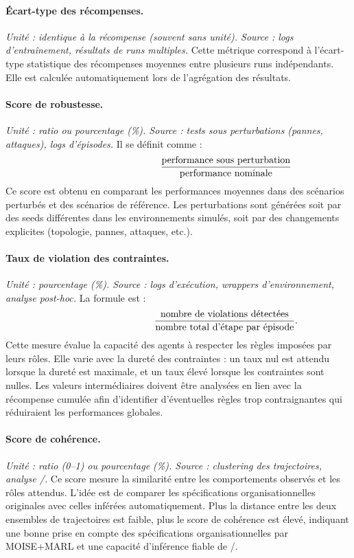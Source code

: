 \paragraph{Écart-type des récompenses.}
\textit{Unité : identique à la récompense (souvent sans unité). Source : logs d'entraînement, résultats de runs multiples.}
Cette métrique correspond à l'écart-type statistique des récompenses moyennes entre plusieurs runs indépendants.
Elle est calculée automatiquement lors de l'agrégation des résultats.

\paragraph{Score de robustesse.}
\textit{Unité : ratio ou pourcentage (\%). Source : tests sous perturbations (pannes, attaques), logs d'épisodes.}
Il se définit comme :
\[
  \hspace{3.5cm}\frac{\text{performance sous perturbation}}{\text{performance nominale}}
\]
Ce score est obtenu en comparant les performances moyennes dans des scénarios perturbés et des scénarios de référence.
Les perturbations sont générées soit par des seeds différentes dans les environnements simulés, soit par des changements explicites (topologie, pannes, attaques, etc.).

\paragraph{Taux de violation des contraintes.}
\textit{Unité : pourcentage (\%). Source : logs d'exécution, wrappers d'environnement, analyse post-hoc.}
La formule est :
\[
  \hspace{3.5cm}\frac{\text{nombre de violations détectées}}{\text{nombre total d'étape par épisode}}.
\]
Cette mesure évalue la capacité des agents à respecter les règles imposées par leurs rôles.
Elle varie avec la dureté des contraintes : un taux nul est attendu lorsque la dureté est maximale, et un taux élevé lorsque les contraintes sont nulles.
Les valeurs intermédiaires doivent être analysées en lien avec la récompense cumulée afin d'identifier d'éventuelles règles trop contraignantes qui réduiraient les performances globales.

\paragraph{Score de cohérence.}
\textit{Unité : ratio (0–1) ou pourcentage (\%). Source : clustering des trajectoires, analyse /.}
Ce score mesure la similarité entre les comportements observés et les rôles attendus.
L'idée est de comparer les spécifications organisationnelles originales avec celles inférées automatiquement.
Plus la distance entre les deux ensembles de trajectoires est faible, plus le score de cohérence est élevé, indiquant une bonne prise en compte des spécifications organisationnelles par MOISE+MARL et une capacité d'inférence fiable de /.

